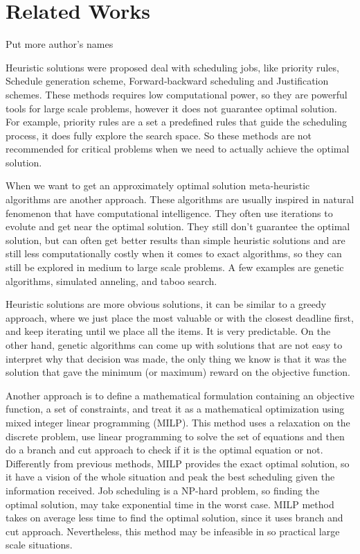 \documentclass[12pt]{article}
\begin{document}
\section*{Related Works}

Put more author's names

Heuristic solutions were proposed deal with scheduling jobs, like priority rules, Schedule generation scheme, Forward‐backward scheduling and Justification schemes. These methods requires low computational power, so they are powerful tools for large scale problems, however it does not guarantee optimal solution. For example, priority rules are a set a predefined rules that guide the scheduling process, it does fully explore the search space. So these methods are not recommended for critical problems when we need to actually achieve the optimal solution.

When we want to get an approximately optimal solution meta-heuristic algorithms are another approach. These algorithms are usually inspired in natural fenomenon that have computational intelligence. They often use iterations to evolute and get near the optimal solution. They still don't guarantee the optimal solution, but can often get better results than simple heuristic solutions and are still less computationally costly when it comes to exact algorithms, so they can still be explored in medium to large scale problems. A few examples are genetic algorithms, simulated anneling, and taboo search.

Heuristic solutions are more obvious solutions, it can be similar to a greedy approach, where we just place the most valuable or with the closest deadline first, and keep iterating until we place all the items. It is very predictable. On the other hand, genetic algorithms can come up with solutions that are not easy to interpret why that decision was made, the only thing we know is that it was the solution that gave the minimum (or maximum) reward on the objective function.

Another approach is to define a mathematical formulation containing an objective function, a set of constraints, and treat it as a mathematical optimization using mixed integer linear programming (MILP). This method uses a relaxation on the discrete problem, use linear programming to solve the set of equations and then do a branch and cut approach to check if it is the optimal equation or not. Differently from previous methods, MILP provides the exact optimal solution, so it have a vision of the whole situation and peak the best scheduling given the information received. Job scheduling is a NP-hard problem, so finding the optimal solution, may take exponential time in the worst case. MILP method takes on average less time to find the optimal solution, since it uses branch and cut approach. Nevertheless, this method may be infeasible in so practical large scale situations.
\end{document}
